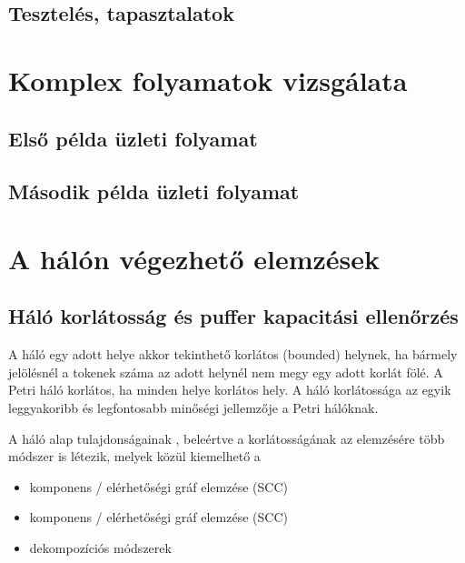 \documentclass[12pt,a4paper]{book}
\begin{document}
\section{Tesztelés, tapasztalatok}


\chapter{Komplex folyamatok vizsgálata}

\section{Első példa üzleti folyamat}


\section{Második példa üzleti folyamat}


\chapter{A hálón végezhető elemzések}
\section{Háló korlátosság és puffer kapacitási ellenőrzés}

A háló egy adott helye akkor tekinthető korlátos (bounded) helynek, ha bármely jelölésnél a tokenek száma az adott helynél nem megy egy adott korlát fölé. A Petri háló korlátos, ha minden helye korlátos hely.
A háló korlátossága az egyik leggyakoribb és legfontosabb minőségi jellemzője a Petri hálóknak. 

A háló alap tulajdonságainak , beleértve a korlátosságának az elemzésére több módszer is létezik, melyek közül kiemelhető a
\begin{itemize}
\item komponens / elérhetőségi gráf elemzése (SCC)
\item komponens / elérhetőségi gráf elemzése (SCC)
\item dekompozíciós módszerek 
\end{itemize}
\end{document}
